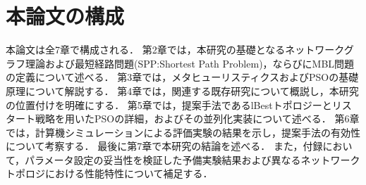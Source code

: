 \section{本論文の構成}
本論文は全7章で構成される．
第2章では，本研究の基礎となるネットワークグラフ理論および最短経路問題(SPP:Shortest Path Problem)，ならびにMBL問題の定義について述べる．
第3章では，メタヒューリスティクスおよびPSOの基礎原理について解説する．
第4章では，関連する既存研究について概説し，本研究の位置付けを明確にする．
第5章では，提案手法であるlBestトポロジーとリスタート戦略を用いたPSOの詳細，およびその並列化実装について述べる．
第6章では，計算機シミュレーションによる評価実験の結果を示し，提案手法の有効性について考察する．
最後に第7章で本研究の結論を述べる．
また，付録において，パラメータ設定の妥当性を検証した予備実験結果および異なるネットワークトポロジにおける性能特性について補足する．